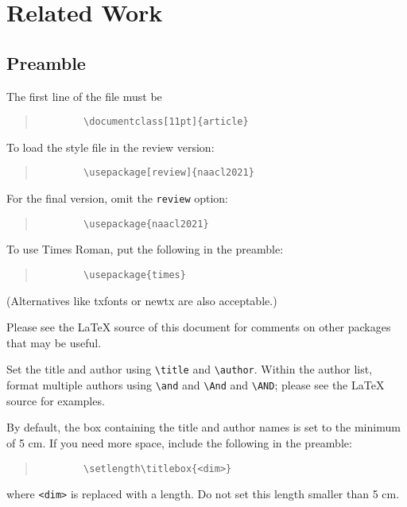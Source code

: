 \section{Related Work}
\label{sec:related}


\subsection{Preamble}

The first line of the file must be
\begin{quote}
	\begin{verbatim}
		\documentclass[11pt]{article}
	\end{verbatim}
\end{quote}

To load the style file in the review version:
\begin{quote}
	\begin{verbatim}
		\usepackage[review]{naacl2021}
	\end{verbatim}
\end{quote}
For the final version, omit the \verb|review| option:
\begin{quote}
	\begin{verbatim}
		\usepackage{naacl2021}
	\end{verbatim}
\end{quote}

To use Times Roman, put the following in the preamble:
\begin{quote}
	\begin{verbatim}
		\usepackage{times}
	\end{verbatim}
\end{quote}
(Alternatives like txfonts or newtx are also acceptable.)

Please see the \LaTeX{} source of this document for comments on other packages that may be useful.

Set the title and author using \verb|\title| and \verb|\author|. Within the author list, format multiple authors using \verb|\and| and \verb|\And| and \verb|\AND|; please see the \LaTeX{} source for examples.

By default, the box containing the title and author names is set to the minimum of 5 cm. If you need more space, include the following in the preamble:
\begin{quote}
	\begin{verbatim}
		\setlength\titlebox{<dim>}
	\end{verbatim}
\end{quote}
where \verb|<dim>| is replaced with a length. Do not set this length smaller than 5 cm.
